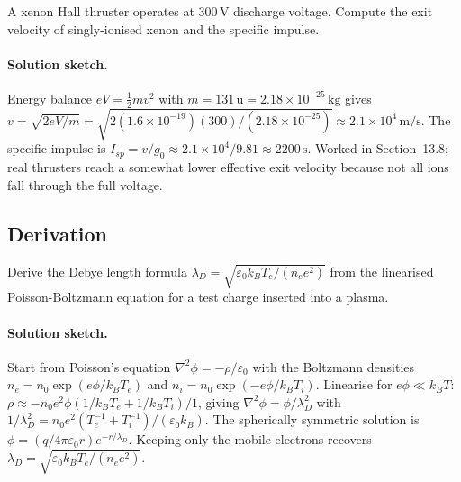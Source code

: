 \begin{exercise}
A xenon Hall thruster operates at $300\,\si{\volt}$ discharge voltage.
Compute the exit velocity of singly-ionised xenon and the
specific impulse.
\paragraph{Solution sketch.} Energy balance $eV = \tfrac12 m v^{2}$ with
$m = 131\,\text{u} = 2.18\times 10^{-25}\,\si{\kilogram}$ gives $v =
\sqrt{2eV/m} = \sqrt{2(1.6\times 10^{-19})(300)/(2.18\times 10^{-25})}
\approx 2.1\times 10^{4}\,\si{\meter\per\second}$. The specific impulse
is $I_{sp} = v/g_{0} \approx 2.1\times 10^{4}/9.81 \approx 2200\,\si{
\second}$. Worked in Section~13.8; real thrusters reach a somewhat lower
effective exit velocity because not all ions fall through the full
voltage.
\end{exercise}

\subsection*{Derivation}

\begin{exercise}
Derive the Debye length formula $\lambda_{D} = \sqrt{\varepsilon_{0}
k_{B}T_{e}/(n_{e}e^{2})}$ from the linearised Poisson-Boltzmann
equation for a test charge inserted into a plasma.
\paragraph{Solution sketch.} Start from Poisson's equation $\nabla^{2}\phi
= -\rho/\varepsilon_{0}$ with the Boltzmann densities $n_{e} = n_{0}
\exp(e\phi/k_{B}T_{e})$ and $n_{i} = n_{0}\exp(-e\phi/k_{B}T_{i})$.
Linearise for $e\phi \ll k_{B}T$: $\rho \approx -n_{0}e^{2}\phi(1/k_{B}
T_{e} + 1/k_{B}T_{i})/1$, giving $\nabla^{2}\phi = \phi/\lambda_{D}^{2}$
with $1/\lambda_{D}^{2} = n_{0}e^{2}(T_{e}^{-1}+T_{i}^{-1})/(\varepsilon_{0}
k_{B})$. The spherically symmetric solution is $\phi = (q/4\pi\varepsilon_{0}
r)e^{-r/\lambda_{D}}$. Keeping only the mobile electrons recovers
$\lambda_{D} = \sqrt{\varepsilon_{0}k_{B}T_{e}/(n_{e}e^{2})}$.
\end{exercise}

